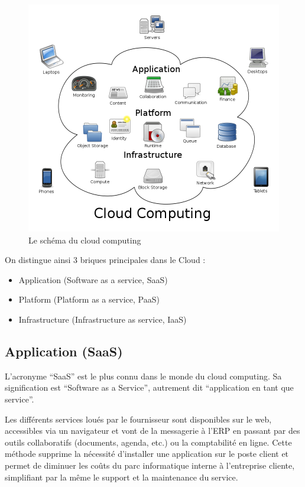 \documentclass[a4paper,12pt]{report}
\begin{document}
\begin{onehalfspace}
	\begin{figure}[!h]
		\centering
		\includegraphics[width=15cm]{schema_structure.png}
		\caption{Le schéma du cloud computing}
	\end{figure}
	
	On distingue ainsi 3 briques principales dans le Cloud :
	\begin{itemize}
		\item Application (Software as a service, SaaS)
		\item Platform (Platform as a service, PaaS)
		\item Infrastructure (Infrastructure as service, IaaS)
	\end{itemize}
	
	\subsection{Application (SaaS)}
	L’acronyme “SaaS” est le plus connu dans le monde du cloud computing. Sa signification est “Software as a Service”, autrement dit “application en tant que service”.
	
	Les différents services loués par le fournisseur sont disponibles sur le web, accessibles via un navigateur et vont de la messagerie à l’ERP en passant par des outils collaboratifs (documents, agenda, etc.) ou la comptabilité en ligne. Cette méthode supprime la nécessité d’installer une application sur le poste client et permet de diminuer les coûts du parc informatique interne à l’entreprise cliente, simplifiant par la même le support et la maintenance du service.
	

\end{onehalfspace}
\end{document}
